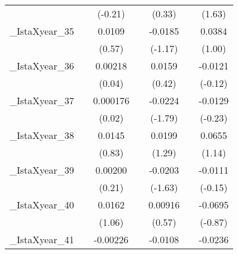 {\begin{tabular}{l*{6}{c}}
            &                     &     (-0.21)         &                     &      (0.33)         &                     &      (1.63)         \\
[1em]
\_IstaXyear\_35&                     &      0.0109         &                     &     -0.0185         &                     &      0.0384         \\
            &                     &      (0.57)         &                     &     (-1.17)         &                     &      (1.00)         \\
[1em]
\_IstaXyear\_36&                     &     0.00218         &                     &      0.0159         &                     &     -0.0121         \\
            &                     &      (0.04)         &                     &      (0.42)         &                     &     (-0.12)         \\
[1em]
\_IstaXyear\_37&                     &    0.000176         &                     &     -0.0224         &                     &     -0.0129         \\
            &                     &      (0.02)         &                     &     (-1.79)         &                     &     (-0.23)         \\
[1em]
\_IstaXyear\_38&                     &      0.0145         &                     &      0.0199         &                     &      0.0655         \\
            &                     &      (0.83)         &                     &      (1.29)         &                     &      (1.14)         \\
[1em]
\_IstaXyear\_39&                     &     0.00200         &                     &     -0.0203         &                     &     -0.0111         \\
            &                     &      (0.21)         &                     &     (-1.63)         &                     &     (-0.15)         \\
[1em]
\_IstaXyear\_40&                     &      0.0162         &                     &     0.00916         &                     &     -0.0695         \\
            &                     &      (1.06)         &                     &      (0.57)         &                     &     (-0.87)         \\
[1em]
\_IstaXyear\_41&                     &    -0.00226         &                     &     -0.0108         &                     &     -0.0236         \\

\end{tabular}}
